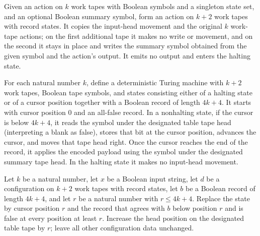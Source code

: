 \begin{definition}
\label{Turing.StepBlock.applyPayload}
\leanok
{}
Given an action on $k$ work tapes with Boolean symbols and a singleton state set, and an
optional Boolean summary symbol, form an action on $k+2$ work tapes with record states.
It copies the input-head movement and the original $k$ work-tape actions; on the first
additional tape it makes no write or movement, and on the second it stays in place and
writes the summary symbol obtained from the given symbol and the action's output. It
emits no output and enters the halting state.
\end{definition}

\begin{definition}
\label{Turing.StepBlock.recordTM}
\leanok
{}
For each natural number $k$, define a deterministic Turing machine with $k+2$ work
tapes, Boolean tape symbols, and states consisting either of a halting state or of a
cursor position together with a Boolean record of length $4k+4$. It starts with cursor
position $0$ and an all-false record. In a nonhalting state, if the cursor is below
$4k+4$, it reads the symbol under the designated table tape head (interpreting a blank
as false), stores that bit at the cursor position, advances the cursor, and moves that
tape head right. Once the cursor reaches the end of the record, it applies the encoded
payload using the symbol under the designated summary tape head. In the halting state it
makes no input-head movement.
\end{definition}

\begin{definition}
\label{Turing.StepBlock.readCfg}
\leanok
{}
Let $k$ be a natural number, let $x$ be a Boolean input string, let $d$ be a
configuration on $k+2$ work tapes with record states, let $b$ be a Boolean record of
length $4k+4$, and let $r$ be a natural number with $r\le 4k+4$. Replace the state by
cursor position $r$ and the record that agrees with $b$ below position $r$ and is false
at every position at least $r$. Increase the head position on the designated table tape
by $r$; leave all other configuration data unchanged.
\end{definition}

